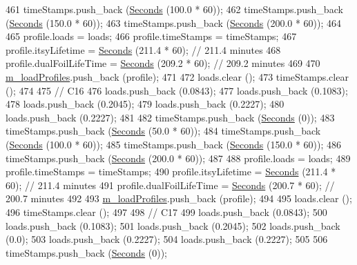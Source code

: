 \begin{DoxyCode}
461   timeStamps.push\_back (\hyperlink{group__timecivil_ga33c34b816f8ff6628e33d5c8e9713b9e}{Seconds} (100.0 * 60));
462   timeStamps.push\_back (\hyperlink{group__timecivil_ga33c34b816f8ff6628e33d5c8e9713b9e}{Seconds} (150.0 * 60));
463   timeStamps.push\_back (\hyperlink{group__timecivil_ga33c34b816f8ff6628e33d5c8e9713b9e}{Seconds} (200.0 * 60));
464 
465   profile.loads = loads;
466   profile.timeStamps = timeStamps;
467   profile.itsyLifetime = \hyperlink{group__timecivil_ga33c34b816f8ff6628e33d5c8e9713b9e}{Seconds} (211.4 * 60);      \textcolor{comment}{// 211.4 minutes}
468   profile.dualFoilLifeTime = \hyperlink{group__timecivil_ga33c34b816f8ff6628e33d5c8e9713b9e}{Seconds} (209.2 * 60);  \textcolor{comment}{// 209.2 minutes}
469 
470   \hyperlink{classBatteryLifetimeTest_aee9ad324da18f58ee75689778580c3fb}{m\_loadProfiles}.push\_back (profile);
471 
472   loads.clear ();
473   timeStamps.clear ();
474 
475   \textcolor{comment}{// C16}
476   loads.push\_back (0.0843);
477   loads.push\_back (0.1083);
478   loads.push\_back (0.2045);
479   loads.push\_back (0.2227);
480   loads.push\_back (0.2227);
481 
482   timeStamps.push\_back (\hyperlink{group__timecivil_ga33c34b816f8ff6628e33d5c8e9713b9e}{Seconds} (0));
483   timeStamps.push\_back (\hyperlink{group__timecivil_ga33c34b816f8ff6628e33d5c8e9713b9e}{Seconds} (50.0 * 60));
484   timeStamps.push\_back (\hyperlink{group__timecivil_ga33c34b816f8ff6628e33d5c8e9713b9e}{Seconds} (100.0 * 60));
485   timeStamps.push\_back (\hyperlink{group__timecivil_ga33c34b816f8ff6628e33d5c8e9713b9e}{Seconds} (150.0 * 60));
486   timeStamps.push\_back (\hyperlink{group__timecivil_ga33c34b816f8ff6628e33d5c8e9713b9e}{Seconds} (200.0 * 60));
487 
488   profile.loads = loads;
489   profile.timeStamps = timeStamps;
490   profile.itsyLifetime = \hyperlink{group__timecivil_ga33c34b816f8ff6628e33d5c8e9713b9e}{Seconds} (211.4 * 60);      \textcolor{comment}{// 211.4 minutes}
491   profile.dualFoilLifeTime = \hyperlink{group__timecivil_ga33c34b816f8ff6628e33d5c8e9713b9e}{Seconds} (200.7 * 60);  \textcolor{comment}{// 200.7 minutes}
492 
493   \hyperlink{classBatteryLifetimeTest_aee9ad324da18f58ee75689778580c3fb}{m\_loadProfiles}.push\_back (profile);
494 
495   loads.clear ();
496   timeStamps.clear ();
497 
498   \textcolor{comment}{// C17}
499   loads.push\_back (0.0843);
500   loads.push\_back (0.1083);
501   loads.push\_back (0.2045);
502   loads.push\_back (0.0);
503   loads.push\_back (0.2227);
504   loads.push\_back (0.2227);
505 
506   timeStamps.push\_back (\hyperlink{group__timecivil_ga33c34b816f8ff6628e33d5c8e9713b9e}{Seconds} (0));

\end{DoxyCode}
